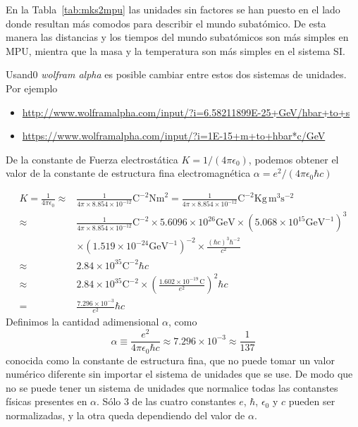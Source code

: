 \begin{frame}
En la Tabla~\ref{tab:mks2mpu} las unidades sin factores se han puesto en el lado donde resultan más comodos para describir el mundo subatómico. De esta manera las distancias y los tiempos del mundo subatómicos son más simples en MPU, mientra que la masa y la temperatura son más simples en el sistema SI.




Usand0 \emph{wolfram alpha}  es posible cambiar entre estos dos sistemas de unidades. Por ejemplo

\begin{itemize}
\item \url{http://www.wolframalpha.com/input/?i=6.58211899E-25+GeV/hbar+to+s}
\item \url{https://www.wolframalpha.com/input/?i=1E-15+m+to+hbar*c/GeV}
\end{itemize}

De la constante de Fuerza electrostática $K=1/(4\pi\epsilon_0)$, podemos obtener el valor de la constante de estructura fina electromagnética $\alpha=e^2/(4\pi\epsilon_0\hbar c)$

\begin{align*}
  K=\frac{1}{4\pi\epsilon_0}\approx&\frac{1}{4\pi\times8.854\times10^{-12}}\text{C}^{-2}\text{Nm}^2
  =\frac{1}{4\pi\times8.854\times10^{-12}}\text{C}^{-2}\text{Kg}\,\text{m}^3\text{s}^{-2}\\
  \approx&\frac{1}{4\pi\times8.854\times10^{-12}}\text{C}^{-2}\times5.6096\times10^{26}\text{GeV}
  \times(5.068\times10^{15}\text{GeV}^{-1})^3\\
  &\times(1.519\times10^{-24}\text{GeV}^{-1})^{-2}\times\frac{(\hbar c)^3\hbar^{-2}}{c^2}\\
  \approx&2.84\times10^{35}\text{C}^{-2}\hbar c\\
  \approx&2.84\times10^{35}\text{C}^{-2}\times
  \left(
    \frac{1.602\times10^{-19}\,\text{C}}{e^2}
  \right)^2\hbar c\\
  =&\frac{7.296\times10^{-3}}{e^2}\hbar c
\end{align*}
Definimos la cantidad adimensional $\alpha$, como
\begin{equation*}
  \alpha\equiv\frac{e^2}{4\pi\epsilon_0\hbar c}
\approx7.296\times10^{-3}\approx\frac{1}{137}
\end{equation*}
conocida como la constante de estructura fina, que no puede tomar un
valor numérico diferente sin importar el sistema de unidades que se
use. De modo que no se puede tener un sistema de unidades que
normalice todas las contanstes físicas presentes en
$\alpha$. Sólo 3 de las cuatro constantes $e$, $\hbar$, $\epsilon_0$
y $c$ pueden ser normalizadas, y la otra queda dependiendo del valor
de $\alpha$.


\end{frame}
